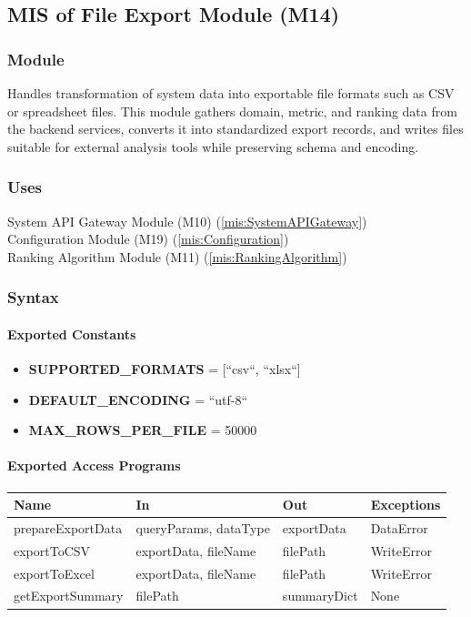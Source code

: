 \documentclass[12pt, titlepage]{article}
\begin{document}
\subsection{MIS of File Export Module (M14)}
\label{mis:FileExportModule}

\subsubsection{Module}
Handles transformation of system data into exportable file formats such as CSV
or spreadsheet files. This module gathers domain, metric, and ranking data from
the backend services, converts it into standardized export records, and writes
files suitable for external analysis tools while preserving schema and encoding.

\subsubsection{Uses}
System API Gateway Module (M10)  (\ref{mis:SystemAPIGateway})\\
Configuration Module (M19)  (\ref{mis:Configuration})\\
Ranking Algorithm Module (M11)  (\ref{mis:RankingAlgorithm})

\subsubsection{Syntax}

\paragraph{Exported Constants}
\begin{itemize}
  \item \textbf{SUPPORTED\_FORMATS} = [``csv``, ``xlsx``]
  \item \textbf{DEFAULT\_ENCODING} = ``utf-8``
  \item \textbf{MAX\_ROWS\_PER\_FILE} = 50000
\end{itemize}

\paragraph{Exported Access Programs}
\begin{center}
\renewcommand{\arraystretch}{1.2}
\begin{tabularx}{\textwidth}{l X X l}
\toprule
\textbf{Name} & \textbf{In} & \textbf{Out} & \textbf{Exceptions}\\
\midrule
prepareExportData & queryParams, dataType & exportData & DataError \\
exportToCSV & exportData, fileName & filePath & WriteError \\
exportToExcel & exportData, fileName & filePath & WriteError \\
getExportSummary & filePath & summaryDict & None \\
\bottomrule
\end{tabularx}
\end{center}
\end{document}
